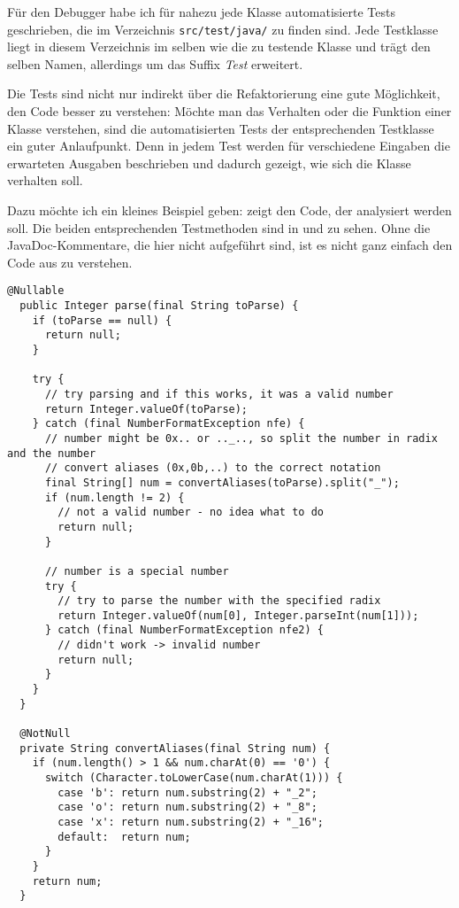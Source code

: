 Für den Debugger habe ich für nahezu jede Klasse automatisierte Tests geschrieben, die im Verzeichnis \texttt{src/test/java/} zu finden sind. Jede Testklasse liegt in diesem Verzeichnis im selben \package wie die zu testende Klasse und trägt den selben Namen, allerdings um das Suffix \emph{Test} erweitert.

Die Tests sind nicht nur indirekt über die Refaktorierung eine gute Möglichkeit, den Code besser zu verstehen: Möchte man das Verhalten oder die Funktion einer Klasse verstehen, sind die automatisierten Tests der entsprechenden Testklasse ein guter Anlaufpunkt. Denn in jedem Test werden für verschiedene Eingaben die erwarteten Ausgaben beschrieben und dadurch gezeigt, wie sich die Klasse verhalten soll.

Dazu möchte ich ein kleines Beispiel geben:  zeigt den Code, der analysiert werden soll. Die beiden entsprechenden Testmethoden sind in  und  zu sehen. Ohne die JavaDoc-Kommentare, die hier nicht aufgeführt sind, ist es nicht ganz einfach den Code aus  zu verstehen.

\begin{lstlisting}[caption={\klasse{IntegerParser} -- relevante Methoden},label=\lstlbl{integerparser-code}]
  @Nullable
  public Integer parse(final String toParse) {
    if (toParse == null) {
      return null;
    }

    try {
      // try parsing and if this works, it was a valid number
      return Integer.valueOf(toParse);
    } catch (final NumberFormatException nfe) {
      // number might be 0x.. or .._.., so split the number in radix and the number
      // convert aliases (0x,0b,..) to the correct notation
      final String[] num = convertAliases(toParse).split("_");
      if (num.length != 2) {
        // not a valid number - no idea what to do
        return null;
      }

      // number is a special number
      try {
        // try to parse the number with the specified radix
        return Integer.valueOf(num[0], Integer.parseInt(num[1]));
      } catch (final NumberFormatException nfe2) {
        // didn't work -> invalid number
        return null;
      }
    }
  }

  @NotNull
  private String convertAliases(final String num) {
    if (num.length() > 1 && num.charAt(0) == '0') {
      switch (Character.toLowerCase(num.charAt(1))) {
        case 'b': return num.substring(2) + "_2";
        case 'o': return num.substring(2) + "_8";
        case 'x': return num.substring(2) + "_16";
        default:  return num;
      }
    }
    return num;
  }
\end{lstlisting}

